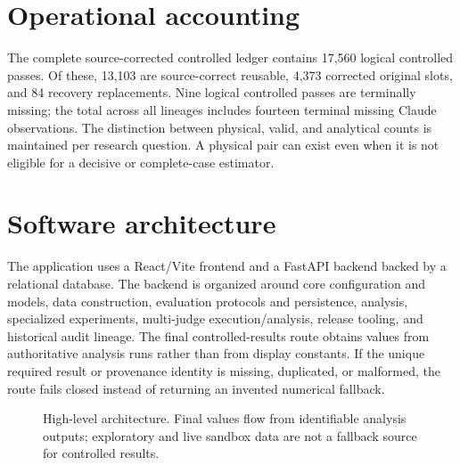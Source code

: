 \section{Operational accounting}

The complete source-corrected controlled ledger contains 17,560 logical controlled passes. Of these, 13,103 are source-correct reusable, 4,373 corrected original slots, and 84 recovery replacements. Nine logical controlled passes are terminally missing; the total across all lineages includes fourteen terminal missing Claude observations. The distinction between physical, valid, and analytical counts is maintained per research question. A physical pair can exist even when it is not eligible for a decisive or complete-case estimator.

\section{Software architecture}

The application uses a React/Vite frontend and a FastAPI backend backed by a relational database. The backend is organized around core configuration and models, data construction, evaluation protocols and persistence, analysis, specialized experiments, multi-judge execution/analysis, release tooling, and historical audit lineage. The final controlled-results route obtains values from authoritative analysis runs rather than from display constants. If the unique required result or provenance identity is missing, duplicated, or malformed, the route fails closed instead of returning an invented numerical fallback.

\begin{figure}[H]
\centering
{}
\caption{High-level architecture. Final values flow from identifiable analysis outputs; exploratory and live sandbox data are not a fallback source for controlled results.}
\label{fig:architecture}
\end{figure}

